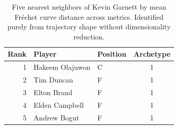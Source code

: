 \begin{table}[htbp]
  \centering\small
  \begin{tabular}{rllc}
    \toprule
    Rank & Player & Position & Archetype \\
    \midrule
    1 & Hakeem Olajuwon & C & 1 \\
    2 & Tim Duncan & F & 1 \\
    3 & Elton Brand & F & 1 \\
    4 & Elden Campbell & F & 1 \\
    5 & Andrew Bogut & F & 1 \\
    \bottomrule
  \end{tabular}
  \caption{Five nearest neighbors of Kevin Garnett by mean Fr\'{e}chet curve distance across metrics. Identified purely from trajectory shape without dimensionality reduction.}
  \label{tab:Kevin_Garnett_frechet_curve_neighbors}
\end{table}

